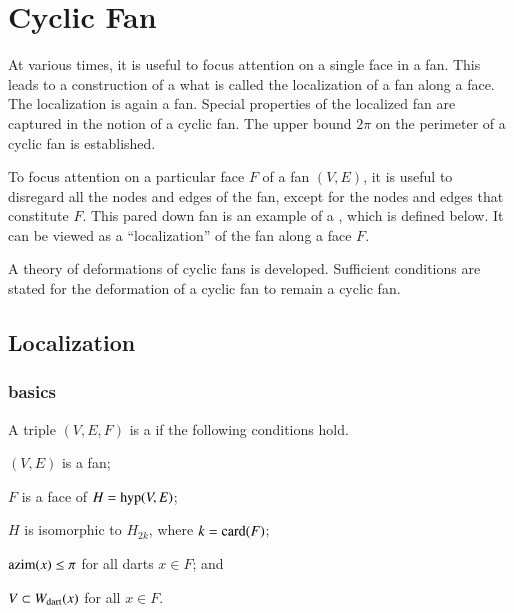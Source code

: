 %

\chapter{Cyclic Fan}\label{sec:cyclic}


\begin{summary}
At various times, it is useful to focus attention on a single face in a fan.  This leads to a construction of a what is called the localization of a fan along a face.  The localization is again a fan.  Special properties of the localized fan are captured in the notion of a cyclic fan.  The upper bound $2\pi$ on the perimeter of a cyclic fan is established.


To focus attention on a particular face $F$ of a fan $(V,E)$, it is useful to disregard all the nodes
and edges of the fan, except for the nodes and edges that constitute $F$.  This pared down fan
is an example of a , which is defined below.  It can be viewed as a ``localization'' of
the fan along a face $F$.  

A theory of deformations of cyclic fans is developed.  Sufficient conditions are stated for the deformation of a cyclic fan to remain a cyclic fan.
\end{summary}


\section{Localization}


\subsection{basics}


\begin{definition}  A triple $(V,E,F)$ is a  if the following conditions hold.
\begin{nomerate} 
\item {} $(V,E)$ is a fan;
\item {} $F$ is a face of $H = {\operatorname{hyp}}(V,E)$;
\item {} $H$ is isomorphic to $H_{2k}$, where $k = {\operatorname{card}}(F)$;
\item {} ${\operatorname{azim}}(x)\le \pi$ for all darts $x\in F$; and
\item {} $V\subset W_{\text{dart}}(x)$ for all $x\in F$.
\end{nomerate}
\end{definition}
%

